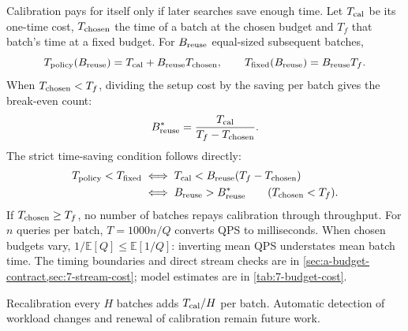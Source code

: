 Calibration pays for itself only if later searches save enough time.
Let $T_{\rm cal}$ be its one-time cost, $T_{\rm chosen}$ the time of a
batch at the chosen budget and $T_f$ that batch's time at a fixed budget.
For $B_{\rm reuse}$ equal-sized subsequent batches,
\begin{equation}
 T_{\rm policy}(B_{\rm reuse})=T_{\rm cal}+B_{\rm reuse}T_{\rm chosen},\qquad
 T_{\rm fixed}(B_{\rm reuse})=B_{\rm reuse}T_f.
 \label{eq:6-total-cost}
\end{equation}
When $T_{\rm chosen}<T_f$, dividing the setup cost by the saving per
batch gives the break-even count:
\begin{equation}
 B_{\rm reuse}^*=\frac{T_{\rm cal}}{T_f-T_{\rm chosen}}.
 \label{eq:6-payback}
\end{equation}
The strict time-saving condition follows directly:
\[
 \begin{aligned}
 T_{\rm policy}<T_{\rm fixed}
 &\iff T_{\rm cal}<B_{\rm reuse}(T_f-T_{\rm chosen})\\
 &\iff B_{\rm reuse}>B_{\rm reuse}^*
 \qquad(T_{\rm chosen}<T_f).
 \end{aligned}
\]
If $T_{\rm chosen}\geq T_f$, no number of batches repays calibration
through throughput. For $n$ queries per batch,
$T=1000n/Q$ converts QPS to milliseconds. When chosen budgets vary,
$1/\mathbb E[Q]\leq\mathbb E[1/Q]$: inverting mean QPS understates
mean batch time. The timing boundaries and direct stream checks are in
\cref{sec:a-budget-contract,sec:7-stream-cost}; model estimates are in
\cref{tab:7-budget-cost}.

Recalibration every $H$ batches adds $T_{\rm cal}/H$ per batch.
Automatic detection of workload changes and renewal of calibration
remain future work.
